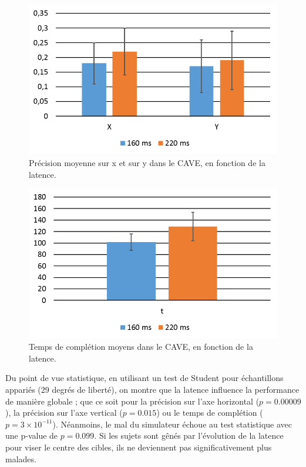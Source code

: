 	\begin{figure}
		\centering
		\includegraphics[width=0.8\linewidth]{Figures/CavePrecisionResults.png}
		\caption{Précision moyenne sur x et sur y dans le CAVE, en fonction de la latence.}
		\label{fig:cave_precision}
	\end{figure}
	
	\begin{figure}
		\centering
		\includegraphics[width=0.8\linewidth]{Figures/CaveCompletionTimeResults.png}
		\caption{Temps de complétion moyens dans le CAVE, en fonction de la latence.}
		\label{fig:cave_completion_time}
	\end{figure}
	
	\par Du point de vue statistique, en utilisant un test de Student pour échantillons appariés (29 degrés de liberté), on montre que la latence influence la performance de manière globale ; que ce soit pour la précision sur l'axe horizontal ($p = 0.00009$), la précision sur l'axe vertical ($p = 0.015$) ou le temps de complétion ($p = 3 \times 10^{-11}$). Néanmoins, le mal du simulateur échoue au test statistique avec une p-value de $p = 0.099$. Si les sujets sont gênés par l'évolution de la latence pour viser le centre des cibles, ils ne deviennent pas significativement plus malades.
	
